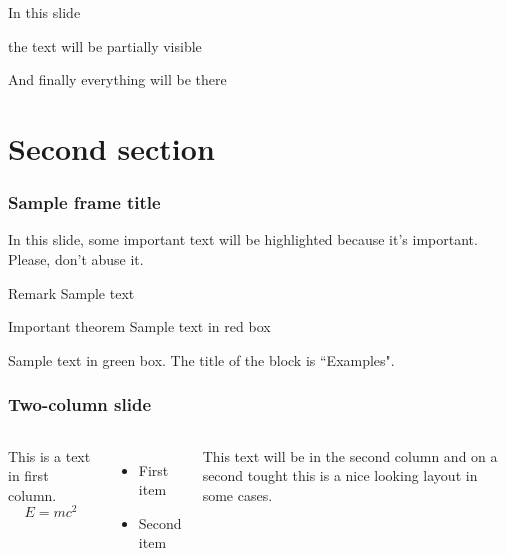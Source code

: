 \documentclass{beamer}
\begin{document}


\begin{frame}
In this slide \pause

the text will be partially visible \pause

And finally everything will be there
\end{frame}

\section{Second section}

\begin{frame}
\frametitle{Sample frame title}

In this slide, some important text will be
\alert{highlighted} because it's important.
Please, don't abuse it.

\begin{block}{Remark}
Sample text
\end{block}

\begin{alertblock}{Important theorem}
Sample text in red box
\end{alertblock}

\begin{examples}
Sample text in green box. The title of the block is ``Examples".
\end{examples}
\end{frame}


\begin{frame}
\frametitle{Two-column slide}

\begin{columns}

This is a text in first column.
$$E=mc^2$$
\begin{itemize}
\item First item
\item Second item
\end{itemize}

This text will be in the second column
and on a second tought this is a nice looking
layout in some cases.
\end{columns}
\end{frame}
\end{document}
